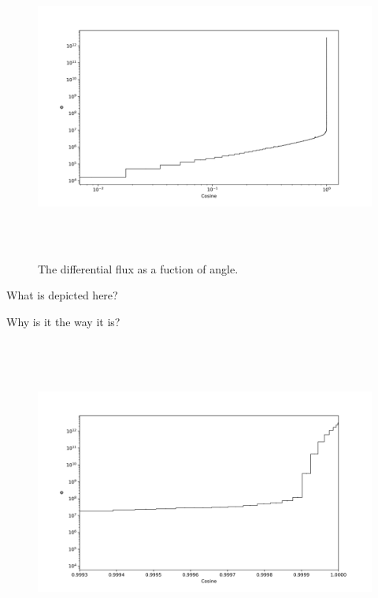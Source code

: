 \clearpage

%
\begin{figure}[htb]
\centering
\includegraphics[height=4in]{tex/figures/flux_cos.png}
\caption[Flux vs. Angle]{The differential flux as a fuction of angle.}
\label{fig:flux_cos}
\end{figure}

What is depicted here?

Why is it the way it is?

\clearpage

%
\begin{figure}[htb]
\centering
\includegraphics[height=4in]{tex/figures/flux_cos_detail.png}
\caption[]{}
\label{fig:}
\end{figure}

